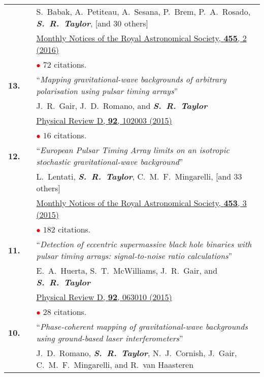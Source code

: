 \documentclass[11pt,letterpaper,sans]{moderncv}
\begin{document}
{\begin{longtable}{rp{0.3cm}p{15.8cm}}
&& S.~Babak, A.~Petiteau, A.~Sesana, P.~Brem, P.~A.~Rosado, \textit{\textbf{S.~R.~Taylor}}, [and 30 others] \\ 
&& \href{http://mnras.oxfordjournals.org/content/455/2/1665}{{\color{color1} Monthly Notices of the Royal Astronomical Society, \textbf{455}, 2 (2016)}} \\
&& \textcolor{red}{$\bullet$} $72$ citations. \vspace{0.09cm}\\
\textbf{13.} & & ``\textit{Mapping gravitational-wave backgrounds of arbitrary polarisation using pulsar timing arrays}'' \\ 
&& J.~R.~Gair, J.~D.~Romano, and \textit{\textbf{S.~R.~Taylor}} \\ 
&& \href{http://journals.aps.org/prd/abstract/10.1103/PhysRevD.92.102003}{{\color{color1} Physical Review D, \textbf{92}, 102003 (2015)}} \\
&& \textcolor{red}{$\bullet$} $16$ citations. \vspace{0.09cm}\\
\textbf{12.} & & ``\textit{European Pulsar Timing Array limits on an isotropic stochastic gravitational-wave background}'' \\ 
&& L.~Lentati, \textit{\textbf{S.~R.~Taylor}}, C.~M.~F.~Mingarelli, [and 33 others] \\ 
&& \href{http://mnras.oxfordjournals.org/content/453/3/2576}{{\color{color1} Monthly Notices of the Royal Astronomical Society, \textbf{453}, 3 (2015)}} \\
&& \textcolor{red}{$\bullet$} $182$ citations. \vspace{0.09cm}\\
\textbf{11.} & & ``\textit{Detection of eccentric supermassive black hole binaries with pulsar timing arrays: signal-to-noise ratio calculations}'' \\ && E.~A.~Huerta, S.~T.~McWilliams, J.~R.~Gair, and \textit{\textbf{S.~R.~Taylor}} \\ 
&& \href{http://journals.aps.org/prd/abstract/10.1103/PhysRevD.92.063010}{{\color{color1} Physical Review D, \textbf{92}, 063010 (2015)}} \\
&& \textcolor{red}{$\bullet$} $28$ citations. \vspace{0.09cm}\\
\textbf{10.} & & ``\textit{Phase-coherent mapping of gravitational-wave backgrounds using ground-based laser interferometers}'' \\ 
&& J.~D.~Romano, \textit{\textbf{S.~R.~Taylor}}, N.~J.~Cornish, J.~Gair, C.~M.~F.~Mingarelli, and R.~van Haasteren \\ 

\end{longtable}}
\end{document}
